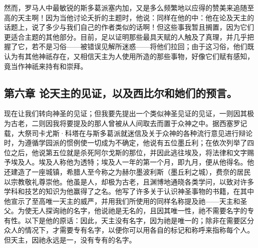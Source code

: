 然而，罗马人中最敏锐的斯多葛派塞内加，又是多么频繁地以应得的赞美来追随至高的天主啊！因为当他讨论夭折的主题时，他说：同样在他的中：他在论及天主的话题上，说了多少与我们自己的作者类似的话啊！但这些事我暂且搁置，因为它们更适合主题的其他部分。目前，足以证明那些最具天赋的人触及了真理，并几乎把握了它，若不是习俗——被错误见解所迷惑——将他们拉回；由于这习俗，他们既认为有其他神祇存在，又相信天主为人使用所造的那些事物，好像它们赋有感知，竟当作神祇来持有和崇拜。\par


\subsection{第六章 论天主的见证，以及西比尔和她们的预言。}

现在让我们转向神圣的见证；但我要先提出一个类似神圣见证的见证，一则因其极为古老，二则因我将要提及的那人曾被从人间取去而置于众神之中。据西塞罗记载，大祭司卡尤斯·科塔在与斯多葛派就迷信及关于众神的各种流行意见进行辩论时，为遵循学园派的惯例使一切成为不确定，他说有五位墨丘利；在依次列举了四位之后，他说第五位就是杀死阿尔戈斯的那位，并因此逃往埃及，将法律和文字赐予埃及人。埃及人称他为透特；埃及人一年的第一个月，即九月，便从他得名。他还建造了一座城镇，希腊人至今称之为赫尔墨波利斯（墨丘利之城），费奈的居民以宗教敬礼尊崇他。他虽是人，却极为古老，且渊博地通晓各类学问，以致对许多学科和技艺的知识为他赢得了之名。他写了许多关于认识神圣事物的书籍，在其中他宣示了至高唯一天主的威严，并用我们所使用的同样名称提及祂——天主和圣父。为使无人探询祂的名字，他说祂是无名的，且因其唯一性，祂不需要名字的专有性。以下是他的原话：因此，天主没有名字，因为祂是唯一的；除非在需要区分众人的情况下，才需要专有名字，以便你可以用各自的标记和称呼来指称每个人。但天主，因祂永远是一，没有专有的名字。\par

